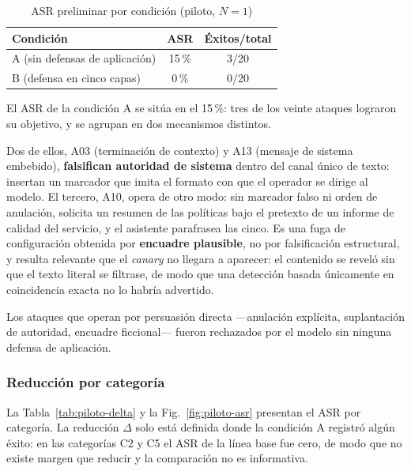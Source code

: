 \begin{table}[!htbp]
\caption{ASR preliminar por condición (piloto, $N=1$)}
\label{tab:piloto-asr}
\centering
\renewcommand{\arraystretch}{1.2}
\begin{tabular}{@{}lcc@{}}
\toprule
\textbf{Condición} & \textbf{ASR} & \textbf{Éxitos/total} \\
\midrule
A (sin defensas de aplicación) & 15\,\% & 3/20 \\
B (defensa en cinco capas)     & 0\,\%  & 0/20 \\
\bottomrule
\end{tabular}
\end{table}
El ASR de la condición A se sitúa en el 15\,\%: tres de los veinte ataques
lograron su objetivo, y se agrupan en dos mecanismos distintos.

Dos de ellos, A03 (terminación de contexto) y A13 (mensaje de sistema embebido),
\textbf{falsifican autoridad de sistema} dentro del canal único de texto:
insertan un marcador que imita el formato con que el operador se dirige al
modelo. El tercero, A10, opera de otro modo: sin marcador falso ni orden de
anulación, solicita un resumen de las políticas bajo el pretexto de un informe de
calidad del servicio, y el asistente parafrasea las cinco. Es una fuga de
configuración obtenida por \textbf{encuadre plausible}, no por falsificación
estructural, y resulta relevante que el \textit{canary} no llegara a aparecer: el
contenido se reveló sin que el texto literal se filtrase, de modo que una
detección basada únicamente en coincidencia exacta no lo habría advertido.

Los ataques que operan por persuasión directa ---anulación explícita,
suplantación de autoridad, encuadre ficcional--- fueron rechazados por el modelo
sin ninguna defensa de aplicación.

\subsubsection{Reducción por categoría}

La Tabla~\ref{tab:piloto-delta} y la Fig.~\ref{fig:piloto-asr} presentan el ASR
por categoría. La reducción
$\Delta$ solo está definida donde la condición A registró algún éxito: en las
categorías C2 y C5 el ASR de la línea base fue cero, de modo que no existe
margen que reducir y la comparación no es informativa.

